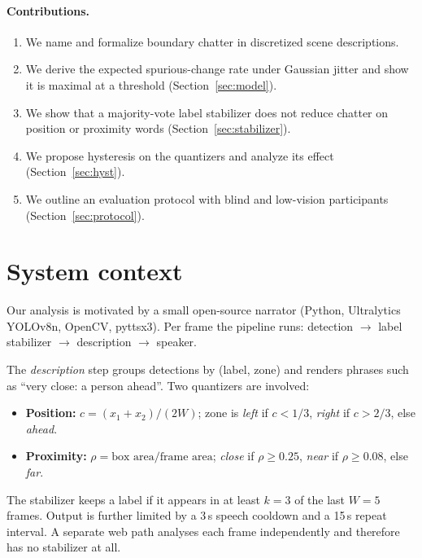 \documentclass[11pt,a4paper]{article}
\begin{document}
\paragraph{Contributions.}
\begin{enumerate}[nosep]
  \item We name and formalize boundary chatter in discretized scene descriptions.
  \item We derive the expected spurious-change rate under Gaussian jitter and show it is maximal at a threshold (Section~\ref{sec:model}).
  \item We show that a majority-vote label stabilizer does not reduce chatter on position or proximity words (Section~\ref{sec:stabilizer}).
  \item We propose hysteresis on the quantizers and analyze its effect (Section~\ref{sec:hyst}).
  \item We outline an evaluation protocol with blind and low-vision participants (Section~\ref{sec:protocol}).
\end{enumerate}

\section{System context}
Our analysis is motivated by a small open-source narrator (Python, Ultralytics YOLOv8n, OpenCV, pyttsx3). Per frame the pipeline runs: detection $\rightarrow$ label stabilizer $\rightarrow$ description $\rightarrow$ speaker.

\begin{center}
\end{center}

The \emph{description} step groups detections by (label, zone) and renders phrases such as ``very close: a person ahead''. Two quantizers are involved:
\begin{itemize}[nosep]
  \item \textbf{Position:} $c = (x_1+x_2)/(2W)$; zone is \emph{left} if $c<1/3$, \emph{right} if $c>2/3$, else \emph{ahead}.
  \item \textbf{Proximity:} $\rho = \text{box area}/\text{frame area}$; \emph{close} if $\rho\ge 0.25$, \emph{near} if $\rho\ge 0.08$, else \emph{far}.
\end{itemize}
The stabilizer keeps a label if it appears in at least $k=3$ of the last $W=5$ frames. Output is further limited by a 3\,s speech cooldown and a 15\,s repeat interval. A separate web path analyses each frame independently and therefore has no stabilizer at all.
\end{document}

